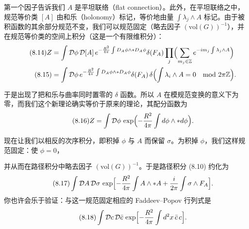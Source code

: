 第一个因子告诉我们 $A$ 是平坦联络（flat connection）。此外，在平坦联络之中，规范等价类 $[A]$ 由和乐（holonomy）标记，等价地由量 $\int\lambda_j\wedge A$ 标记。由于被积函数的其余部分规范不变，我们可以规范固定（略去因子 $(\mathrm{vol}(G))^{-1}$），并在规范等价类的空间上积分（这是一个有限维积分）：
\begin{align}
  \tag{8.14}
  \label{eq:8-14}
  Z&=\int\mathcal{D}\phi\,\mathcal{D}[A]\,e^{-\frac{R^2}{4\pi}\int D_A\phi\wedge\ast D_A\phi}\delta(F_A)
  \prod_j\Bigl(\sum_{m_j\in\mathbb{Z}}e^{-im_j\int\lambda_j\wedge A}\Bigr)\\
  \tag{8.15}
  \label{eq:8-15}
  &=\int\mathcal{D}\phi\,e^{-\frac{R^2}{4\pi}\int D_A\phi\wedge\ast D_A\phi}\delta(F_A)\,
  \delta\Bigl(\int\lambda_i\wedge A=0\quad\mathrm{mod}\ 2\pi\mathbb{Z}\Bigr).
\end{align}


于是出现了把和乐与曲率同时置零的 $\delta$ 函数。所以 $A$ 在模规范变换的意义下为零，而我们这个新理论确实等价于原来的理论，其配分函数为
\begin{equation}
  \tag{8.16}
  \label{eq:8-16}
  Z=\int\mathcal{D}\phi\,\exp\Bigl(-\frac{R^2}{4\pi}\int d\phi\wedge\ast d\phi\Bigr).
\end{equation}

现在让我们以相反的次序积分，即积掉 $\phi$ 与 $A$ 而保留 $\sigma$。为积掉 $\phi$，我们这样规范固定：使 $\phi=0$，

并从而在路径积分中略去因子 $(\mathrm{vol}(G))^{-1}$。于是路径积分 (8.10) 约化为
\begin{equation}
  \tag{8.17}
  \label{eq:8-17}
  \int\mathcal{D}A\,\mathcal{D}\sigma\,\exp\Bigl[-\frac{R^2}{4\pi}\int A\wedge\ast A+\frac{i}{2\pi}\int\sigma\wedge F_A\Bigr].
\end{equation}
你也许会乐于验证：与这一规范固定相应的 Faddeev–Popov 行列式是
\begin{equation}
  \tag{8.18}
  \label{eq:8-18}
  \int\mathcal{D}c\,\mathcal{D}\bar c\,\exp\Bigl[-\frac{R^2}{4\pi}\int d^2x\,\bar c\,c\Bigr].
\end{equation}

